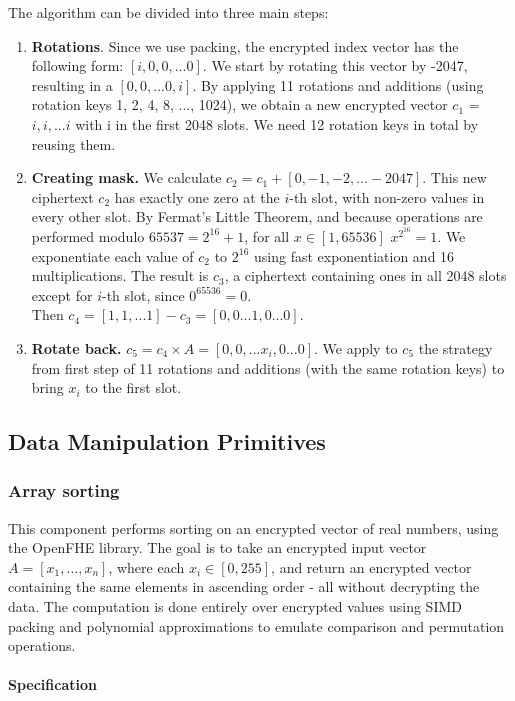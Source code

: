 \documentclass[article]{iacrtrans}
\begin{document}
The algorithm can be divided into three main steps:
\begin{enumerate}
    \item \textbf{Rotations}. Since we use packing, the encrypted index vector has the following form: $[i, 0, 0, ... 0]$. We start by rotating this vector by -2047, resulting in a $[0, 0, ... 0, i]$. By applying 11 rotations and additions (using rotation keys 1, 2, 4, 8, ..., 1024), we obtain a new encrypted vector $c_1$ = $i, i, ... i$ with i in the first 2048 slots. We need 12 rotation keys in total by reusing them.
    \item \textbf {Creating mask.} We calculate $c_2 = c_1 + [0, -1, -2, ... -2047]$. This new ciphertext $c_2$ has exactly one zero at the $i$-th slot, with non-zero values in every other slot.
    By Fermat's Little Theorem, and because operations are performed modulo $65537 = 2^{16}+1$, for all $x \in [1, 65536]$ $x^{2^{16}} = 1$. We exponentiate each value of $c_2$ to $2^{16}$ using fast exponentiation and 16 multiplications. The result is $c_3$, a ciphertext containing ones in all 2048 slots except for $i$-th slot, since $0^{65536}=0$.\\
    Then $c_4 = [1, 1, ... 1] - c_3 = [0, 0 ... 1, 0 ...0]$.
    \item \textbf {Rotate back.} $c_5 = c_4 \times A = [0, 0, ... x_i, 0 ...0]$. We apply to $c_5$ the strategy from first step of 11 rotations and additions (with the same rotation keys) to bring $x_i$ to the first slot.
\end{enumerate}


\subsection{Data Manipulation Primitives}
\subsubsection{Array sorting}
This component performs sorting on an encrypted vector of real numbers, using the OpenFHE library. The goal is to take an encrypted input vector $A = [x_1, \dots, x_n]$, where each $x_i \in [0, 255]$, and return an encrypted vector containing the same elements in ascending order - all without decrypting the data. The computation is done entirely over encrypted values using SIMD packing and polynomial approximations to emulate comparison and permutation operations.

\paragraph{Specification}
\end{document}
